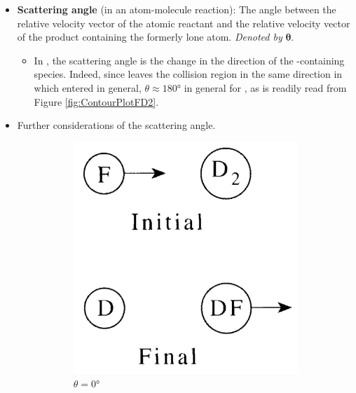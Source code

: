 \documentclass[../notes.tex]{subfiles}
\begin{document}
\begin{itemize}
\begin{itemize}
    \end{itemize}
    \item \textbf{Scattering angle} (in an atom-molecule reaction): The angle between the relative velocity vector of the atomic reactant and the relative velocity vector of the product containing the formerly lone atom. \emph{Denoted by} $\bm{\theta}$.
    \begin{itemize}
        \item In , the scattering angle is the change in the direction of the -containing species. Indeed, since  leaves the collision region in the same direction in which  entered in general, $\theta\approx\ang{180}$ in general for , as is readily read from Figure \ref{fig:ContourPlotFD2}.
    \end{itemize}
    \item Further considerations of the scattering angle.
    \begin{figure}[h!]
        \centering
        \begin{subfigure}[b]{0.25\linewidth}
            \centering
            \includegraphics[width=0.7\linewidth]{../ExtFiles/FD2scatteringa.png}
            \caption{$\theta=\ang{0}$}
            \label{fig:FD2scatteringa}
        \end{subfigure}
        \begin{subfigure}[b]{0.25\linewidth}
            \centering

\end{subfigure}
\end{figure}
\end{itemize}
\end{document}
